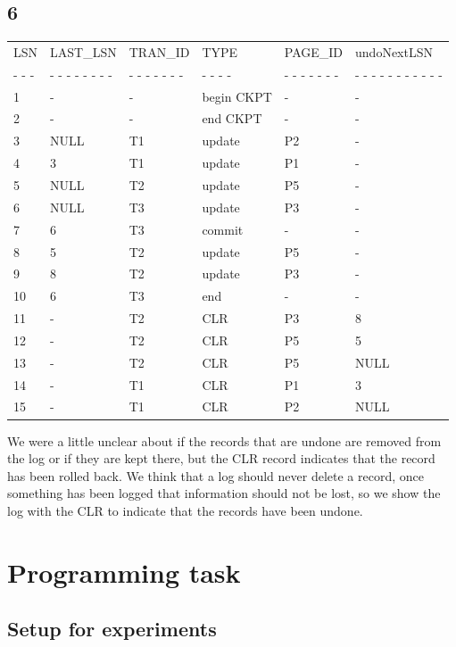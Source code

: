 \documentclass{article}
\theoremstyle{plain}
\theoremstyle{nonumberplain}
\begin{document}
\subsection*{6}
\begin{tabular}{ l  l  l  l  l  l }
	LSN & LAST\_LSN & TRAN\_ID & TYPE & PAGE\_ID & undoNextLSN \\
	- - - & - - - - - - - - & - - - - - - - & - - - - & - - - - - - - & - - - - - - - - - - - \\
	1 & - & - & begin CKPT & - & - \\
	2 & - & - & end CKPT & - & - \\
	3 & NULL & T1 & update & P2 & - \\
	4 & 3 & T1 & update & P1 & - \\
	5 & NULL & T2 & update & P5 & - \\
	6 & NULL & T3 & update & P3 & - \\
	7 & 6 & T3 & commit & - & - \\
	8 & 5 & T2 & update & P5 & - \\
	9 & 8 & T2 & update & P3 & - \\
	10 & 6 & T3 & end & - & - \\
	11 & - & T2 & CLR & P3 & 8 \\
	12 & - & T2 & CLR & P5 & 5 \\
	13 & - & T2 & CLR & P5 & NULL \\
	14 & - & T1 & CLR & P1 & 3 \\
	15 & - & T1 & CLR & P2 & NULL \\
\end{tabular}
We were a little unclear about if the records that are undone are removed from the log or if they are kept there, but the CLR record indicates that the record has been rolled back. We think that a log should never delete a record, once something has been logged that information should not be lost, so we show the log with the CLR to indicate that the records have been undone.

\section{Programming task}


\subsection{Setup for experiments}
\end{document}
